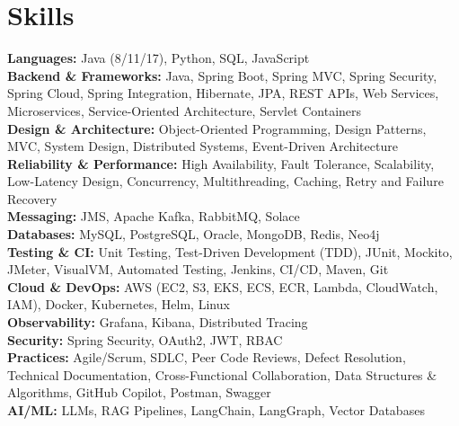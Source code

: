 \documentclass[letterpaper,11pt]{article}
\begin{document}
\section{Skills}
\begin{itemize}[leftmargin=0.15in, label={}]
  \small{\item{
    \textbf{Languages:} Java (8/11/17), Python, SQL, JavaScript \\
    \textbf{Backend \& Frameworks:} Java, Spring Boot, Spring MVC, Spring Security, Spring Cloud, Spring Integration, Hibernate, JPA, REST APIs, Web Services, Microservices, Service-Oriented Architecture, Servlet Containers \\
    \textbf{Design \& Architecture:} Object-Oriented Programming, Design Patterns, MVC, System Design, Distributed Systems, Event-Driven Architecture \\
    \textbf{Reliability \& Performance:} High Availability, Fault Tolerance, Scalability, Low-Latency Design, Concurrency, Multithreading, Caching, Retry and Failure Recovery \\
    \textbf{Messaging:} JMS, Apache Kafka, RabbitMQ, Solace \\
    \textbf{Databases:} MySQL, PostgreSQL, Oracle, MongoDB, Redis, Neo4j \\
    \textbf{Testing \& CI:} Unit Testing, Test-Driven Development (TDD), JUnit, Mockito, JMeter, VisualVM, Automated Testing, Jenkins, CI/CD, Maven, Git \\
    \textbf{Cloud \& DevOps:} AWS (EC2, S3, EKS, ECS, ECR, Lambda, CloudWatch, IAM), Docker, Kubernetes, Helm, Linux \\
    \textbf{Observability:} Grafana, Kibana, Distributed Tracing \\
    \textbf{Security:} Spring Security, OAuth2, JWT, RBAC \\
    \textbf{Practices:} Agile/Scrum, SDLC, Peer Code Reviews, Defect Resolution, Technical Documentation, Cross-Functional Collaboration, Data Structures \& Algorithms, GitHub Copilot, Postman, Swagger \\
    \textbf{AI/ML:} LLMs, RAG Pipelines, LangChain, LangGraph, Vector Databases
  }}
\end{itemize}
\vspace{-8pt}
\end{document}
